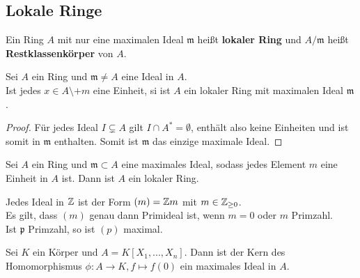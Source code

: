 	\subsection{Lokale Ringe}
	\begin{definition}
		Ein Ring $A$ mit nur eine maximalen Ideal $\mathfrak m$ heißt \textbf{lokaler Ring} und $A/\mathfrak m$ heißt \textbf{Restklassenkörper} von $A$.
	\end{definition}
	
	\begin{satz}
		Sei $A$ ein Ring und $\mathfrak m\neq A$ eine Ideal in $A$.\\
		Ist jedes $x\in A\setminus \mathfrak+ m$ eine Einheit, si ist $A$ ein lokaler Ring mit maximalen Ideal $\mathfrak m$.
	\end{satz}
	\begin{proof}
		Für jedes Ideal $I\subsetneq A$ gilt $I\cap A^*=\emptyset$, enthält also keine Einheiten und ist somit in $\mathfrak m$ enthalten. Somit ist $\mathfrak m$ das einzige maximale Ideal.
	\end{proof}

	\begin{satz}
		Sei $A$ ein Ring und $\mathfrak m\subset A$ eine maximales Ideal, sodass jedes Element $m$ eine Einheit in $A$ ist. Dann ist $A$ ein lokaler Ring.
	\end{satz}

	\begin{exmlist}
		\begin{exm}
			Jedes Ideal in $\mathbb{Z}$ ist der Form $(m)=\mathbb{Z} m$ mit $m\in\mathbb{Z}_{\geq 0}$.\\
			Es gilt, dass $(m)$ genau dann Primideal ist, wenn $m=0$ oder $m$ Primzahl.\\
			Ist $\mathfrak p$ Primzahl, so ist $(p)$ maximal.
			\item Sei $K$ ein Körper und $A=K[X_1,...,X_n]$. Dann ist der Kern des Homomorphismus $\phi:A\to K,f\mapsto f(0)$ ein maximales Ideal in $A$.
		\end{exm}
	\end{exmlist}

